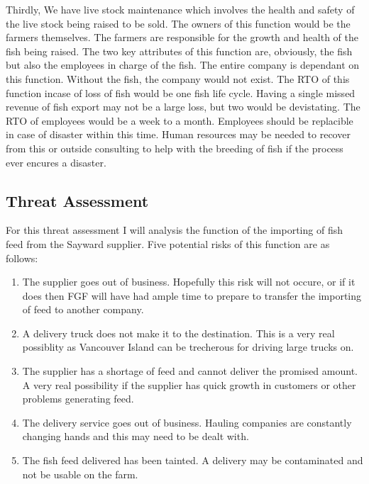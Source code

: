 \documentclass[paper=a4, fontsize=11pt]{scrartcl} %
\numberwithin{equation}{section} %
\numberwithin{figure}{section} %
\numberwithin{table}{section} %
\begin{document}
Thirdly, We have live stock maintenance which
involves the health and safety of the live stock being raised to be sold. The owners of this
function would be the farmers themselves. The farmers are responsible for the growth and
health of the fish being raised. The two key attributes of this function are, obviously, the
fish but also the employees in charge of the fish. The entire company is dependant on this 
function. Without the fish, the company would not exist. The RTO of this function incase 
of loss of fish would be one fish life cycle. Having a single missed revenue of fish export
may not be a large loss, but two would be devistating. The RTO of employees would be a week
to a month. Employees should be replacible in case of disaster within this time. Human 
resources may be needed to recover from this or outside consulting to help with the
breeding of fish if the process ever encures a disaster.\\

\subsection{Threat Assessment}

For this threat assessment I will analysis the function of the importing of fish feed
from the Sayward supplier. Five potential risks of this function are as follows:

\begin{enumerate}

\item The supplier goes out of business. Hopefully this risk will not occure, or if it
does then FGF will have had ample time to prepare to transfer the importing of feed to 
another company.
\item A delivery truck does not make it to the destination. This is a very real possiblity
as Vancouver Island can be trecherous for driving large trucks on.
\item The supplier has a shortage of feed and cannot deliver the promised amount. A 
very real possibility if the supplier has quick growth in customers or other problems
generating feed.
\item The delivery service goes out of business. Hauling companies are constantly
changing hands and this may need to be dealt with.
\item The fish feed delivered has been tainted. A delivery may be contaminated and not
be usable on the farm.

\end{enumerate}
\end{document}
